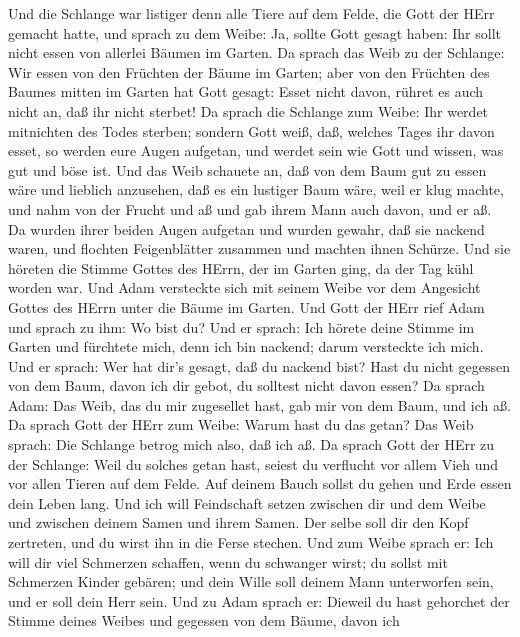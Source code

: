  Und die Schlange war listiger denn alle Tiere auf dem
Felde, die Gott der HErr gemacht hatte, und sprach zu dem Weibe: Ja,
sollte Gott gesagt haben: Ihr sollt nicht essen von allerlei Bäumen im
Garten.  Da sprach das Weib zu der Schlange: Wir essen von
den Früchten der Bäume im Garten;  aber von den Früchten des
Baumes mitten im Garten hat Gott gesagt: Esset nicht davon, rühret es
auch nicht an, daß ihr nicht sterbet!  Da sprach die
Schlange zum Weibe: Ihr werdet mitnichten des Todes sterben;
 sondern Gott weiß, daß, welches Tages ihr davon esset, so
werden eure Augen aufgetan, und werdet sein wie Gott und wissen, was gut
und böse ist.  Und das Weib schauete an, daß von dem Baum
gut zu essen wäre und lieblich anzusehen, daß es ein lustiger Baum wäre,
weil er klug machte, und nahm von der Frucht und aß und gab ihrem Mann
auch davon, und er aß.  Da wurden ihrer beiden Augen
aufgetan und wurden gewahr, daß sie nackend waren, und flochten
Feigenblätter zusammen und machten ihnen Schürze.  Und sie
höreten die Stimme Gottes des HErrn, der im Garten ging, da der Tag kühl
worden war. Und Adam versteckte sich mit seinem Weibe vor dem Angesicht
Gottes des HErrn unter die Bäume im Garten.  Und Gott der
HErr rief Adam und sprach zu ihm: Wo bist du?  Und er
sprach: Ich hörete deine Stimme im Garten und fürchtete mich, denn ich
bin nackend; darum versteckte ich mich.  Und er sprach: Wer
hat dir's gesagt, daß du nackend bist? Hast du nicht gegessen von dem
Baum, davon ich dir gebot, du solltest nicht davon essen? 
Da sprach Adam: Das Weib, das du mir zugesellet hast, gab mir von dem
Baum, und ich aß.  Da sprach Gott der HErr zum Weibe: Warum
hast du das getan? Das Weib sprach: Die Schlange betrog mich also, daß
ich aß.  Da sprach Gott der HErr zu der Schlange: Weil du
solches getan hast, seiest du verflucht vor allem Vieh und vor allen
Tieren auf dem Felde. Auf deinem Bauch sollst du gehen und Erde essen
dein Leben lang.  Und ich will Feindschaft setzen zwischen
dir und dem Weibe und zwischen deinem Samen und ihrem Samen. Der selbe
soll dir den Kopf zertreten, und du wirst ihn in die Ferse stechen.
 Und zum Weibe sprach er: Ich will dir viel Schmerzen
schaffen, wenn du schwanger wirst; du sollst mit Schmerzen Kinder
gebären; und dein Wille soll deinem Mann unterworfen sein, und er soll
dein Herr sein.  Und zu Adam sprach er: Dieweil du hast
gehorchet der Stimme deines Weibes und gegessen von dem Bäume, davon ich
